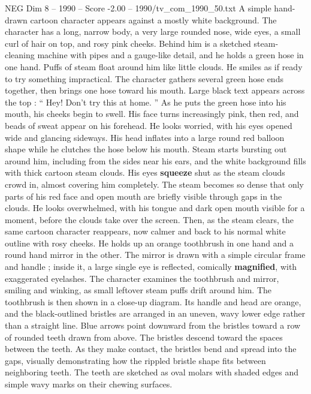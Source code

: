 \begin{textsample}{NEG Dim 8 – 1990 – Score -2.00 – 1990/tv\_com\_1990\_50.txt}  \label{ex:f8_neg_039}
A simple hand-drawn cartoon character appears against a mostly white background.
The character has a long, narrow body, a very large rounded nose, wide eyes, a small curl of hair on top, and rosy pink cheeks.
Behind him is a sketched steam-cleaning machine with pipes and a gauge-like detail, and he holds a green hose in one hand.
Puffs of steam float around him like little clouds.
He smiles as if ready to try something impractical.
The character gathers several green hose ends together, then brings one hose toward his mouth.
Large black text appears across the top : “ Hey!
Don't try this at home. ” As he puts the green hose into his mouth, his cheeks begin to swell.
His face turns increasingly pink, then red, and beads of sweat appear on his forehead.
He looks worried, with his eyes opened wide and glancing sideways.
His head inflates into a large round red balloon shape while he clutches the hose below his mouth.
Steam starts bursting out around him, including from the sides near his ears, and the white background fills with thick cartoon steam clouds.
His eyes \textbf{squeeze} shut as the steam clouds crowd in, almost covering him completely.
The steam becomes so dense that only parts of his red face and open mouth are briefly visible through gaps in the clouds.
He looks overwhelmed, with his tongue and dark open mouth visible for a moment, before the clouds take over the screen.
Then, as the steam clears, the same cartoon character reappears, now calmer and back to his normal white outline with rosy cheeks.
He holds up an orange toothbrush in one hand and a round hand mirror in the other.
The mirror is drawn with a simple circular frame and handle ; inside it, a large single eye is reflected, comically \textbf{magnified}, with exaggerated eyelashes.
The character examines the toothbrush and mirror, smiling and winking, as small leftover steam puffs drift around him.
The toothbrush is then shown in a close-up diagram.
Its handle and head are orange, and the black-outlined bristles are arranged in an uneven, wavy lower edge rather than a straight line.
Blue arrows point downward from the bristles toward a row of rounded teeth drawn from above.
The bristles descend toward the spaces between the teeth.
As they make contact, the bristles bend and spread into the gaps, visually demonstrating how the rippled bristle shape fits between neighboring teeth.
The teeth are sketched as oval molars with shaded edges and simple wavy marks on their chewing surfaces.

\end{textsample}
